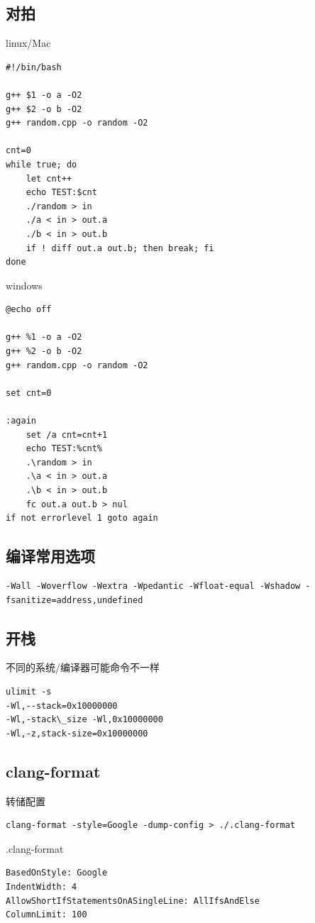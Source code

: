 \documentclass[UTF8]{ctexart}
\begin{document}
\begin{sloppypar}
\subsection{对拍}

linux/Mac

\begin{lstlisting}[style=cpp]
#!/bin/bash

g++ $1 -o a -O2
g++ $2 -o b -O2
g++ random.cpp -o random -O2

cnt=0
while true; do
    let cnt++
    echo TEST:$cnt
    ./random > in
    ./a < in > out.a
    ./b < in > out.b
    if ! diff out.a out.b; then break; fi
done
\end{lstlisting}

windows

\begin{lstlisting}[style=cpp]
@echo off

g++ %1 -o a -O2
g++ %2 -o b -O2
g++ random.cpp -o random -O2

set cnt=0

:again
    set /a cnt=cnt+1
    echo TEST:%cnt%
    .\random > in
    .\a < in > out.a
    .\b < in > out.b
    fc out.a out.b > nul
if not errorlevel 1 goto again
\end{lstlisting}

\subsection{编译常用选项}

\begin{lstlisting}[style=cpp]
-Wall -Woverflow -Wextra -Wpedantic -Wfloat-equal -Wshadow -fsanitize=address,undefined
\end{lstlisting}

\subsection{开栈}

不同的系统/编译器可能命令不一样

\begin{lstlisting}[style=cpp]
ulimit -s
-Wl,--stack=0x10000000
-Wl,-stack\_size -Wl,0x10000000
-Wl,-z,stack-size=0x10000000
\end{lstlisting}

\subsection{clang-format}

转储配置

\begin{lstlisting}[style=cpp]
clang-format -style=Google -dump-config > ./.clang-format
\end{lstlisting}

.clang-format

\begin{lstlisting}[style=cpp]
BasedOnStyle: Google
IndentWidth: 4
AllowShortIfStatementsOnASingleLine: AllIfsAndElse
ColumnLimit: 100
\end{lstlisting}

\end{sloppypar}
\end{document}
